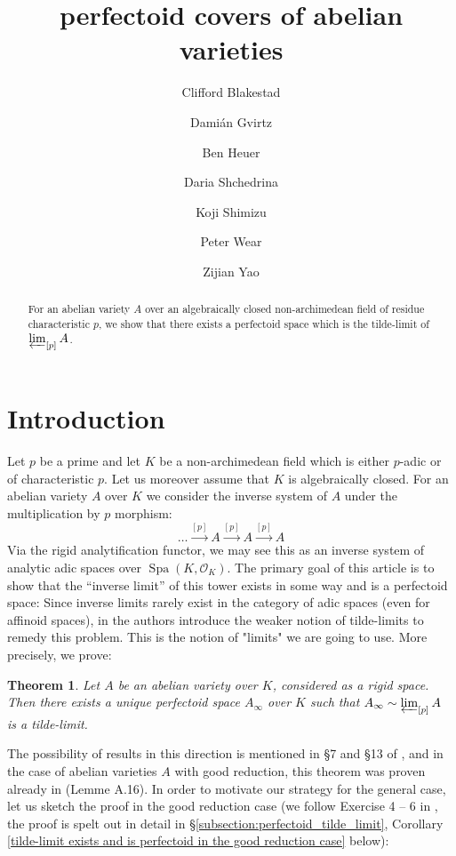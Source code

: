 \documentclass[10pt,oneside]{amsart}
\title[perfectoid covers of abelian varieties]{perfectoid  covers of abelian varieties}
\author{
	Clifford Blakestad \and
	Dami\'an Gvirtz \and
	Ben Heuer \and 
	Daria Shchedrina \and
	Koji Shimizu \and 
	Peter Wear \and
	Zijian Yao}
\newtheorem{mainthm}{Theorem}
\theoremstyle{definition}
\begin{document}
	
	\maketitle
	
	\begin{abstract}
For an abelian variety $A$ over an algebraically closed non-archimedean field of residue characteristic $p$, we show that there exists a perfectoid space which is the tilde-limit of $\varprojlim_{[p]}A$.
	\end{abstract}
	

	
	\section{Introduction} 

Let $p$ be a prime and let $K$ be a non-archimedean field which is either $p$-adic or of characteristic $p$. 
Let us moreover assume that $K$ is algebraically closed. 
For an abelian variety $A$ over $K$ we consider the inverse system of $A$ under the multiplication by $p$ morphism:
\[\dots\xrightarrow{[p]}A\xrightarrow{[p]}A\xrightarrow{[p]}A\]
Via the rigid analytification functor, we may see this as an inverse system of analytic adic spaces over $\operatorname{Spa}(K,\mathcal O_K)$.
The primary goal of this article is to show that the ``inverse limit'' of this tower exists in some way and is a perfectoid space: Since inverse limits rarely exist in the category of adic spaces (even for affinoid spaces), in \cite{SW} the authors introduce the weaker notion of tilde-limits to remedy this problem. This is the notion of "limits" we are going to use. More precisely, we prove:

 


\begin{mainthm} \label{thm:main_thm_intro}
	Let $A$ be an abelian variety over $K$, considered as a rigid space. Then there exists a unique perfectoid space $A_\infty$ over $K$ such that
	$A_\infty \sim \varprojlim_{[p]} A$ is a tilde-limit.
\end{mainthm}

The possibility of results in this direction is mentioned in \S 7 and \S 13 of \cite{scholzeICMproceedings}, and in the case of abelian varieties $A$ with good reduction, this theorem was proven already in \cite{Pilloni-Stroh} (Lemme A.16).  In order to motivate our strategy for the general case, let us sketch the proof in the good reduction case (we follow Exercise 4 -- 6 in \cite{Bhatt}, the proof is spelt out in detail in \S \ref{subsection:perfectoid_tilde_limit}, Corollary \ref{tilde-limit exists and is perfectoid in the good reduction case} below):
\end{document}
